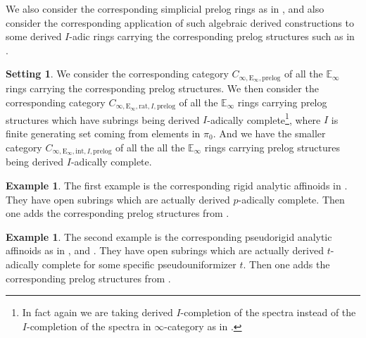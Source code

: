 \documentclass[11pt]{book}
\theoremstyle{definition}
\numberwithin{equation}{section}
\newtheorem{example}[theorem]{Example}
\newtheorem{setting}[theorem]{Setting}
\begin{document}
\indent We also consider the corresponding simplicial prelog rings as in \cite[Chapter 6]{12B1}, and also consider the corresponding application of such algebraic derived constructions to some derived $I$-adic rings carrying the corresponding prelog structures such as in \cite[Chapter 2]{12DLLZ1}.


\begin{setting}
We consider the corresponding category $C_{\infty,\mathrm{E}_\infty,\mathrm{prelog}}$ of all the $\mathbb{E}_\infty$ rings carrying the corresponding prelog structures. We then consider the corresponding category $C_{\infty,\mathrm{E}_\infty,\mathrm{rat},I,\mathrm{prelog}}$ of all the $\mathbb{E}_\infty$ rings carrying prelog structures which have subrings being derived $I$-adically complete\footnote{In fact again we are taking derived $I$-completion of the spectra instead of the $I$-completion of the spectra in $\infty$-category as in  \cite[Chapter 7.3]{12Lu2}.}, where $I$ is finite generating set coming from elements in $\pi_0$. And we have the smaller category $C_{\infty,\mathrm{E}_\infty,\mathrm{int},I,\mathrm{prelog}}$ of all the all the $\mathbb{E}_\infty$ rings carrying prelog structures being derived $I$-adically complete.	
\end{setting}



\begin{example}
The first example is the corresponding rigid analytic affinoids in \cite[Definition 4.1]{12Ta}. They have open subrings which are actually derived $p$-adically complete. Then one adds the corresponding prelog structures from \cite[Chapter 2]{12DLLZ1}. 
\end{example}


\begin{example}
The second example is the corresponding pseudorigid analytic affinoids as in \cite[Definition 3.1]{12Bel1}, \cite{12Bel2} and \cite[Definition 4.1]{12L}. They have open subrings which are actually derived $t$-adically complete for some specific pseudouniformizer $t$. Then one adds the corresponding prelog structures from \cite[Chapter 2]{12DLLZ1}. 
\end{example}
\end{document}

